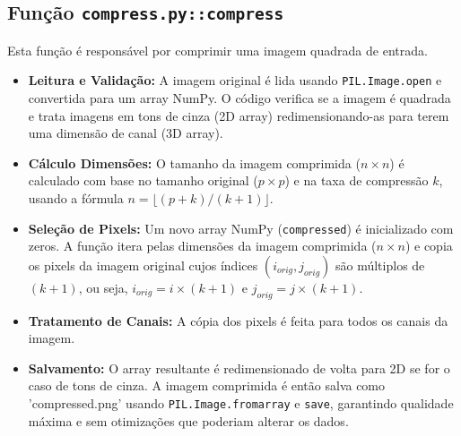 \documentclass[12pt, a4paper]{article}
\begin{document}
\subsection{Função \texttt{compress.py::compress}}
Esta função é responsável por comprimir uma imagem quadrada de entrada.
\begin{itemize}
    \item \textbf{Leitura e Validação:} A imagem original é lida usando \texttt{PIL.Image.open} e convertida para um array NumPy. O código verifica se a imagem é quadrada e trata imagens em tons de cinza (2D array) redimensionando-as para terem uma dimensão de canal (3D array).
    \item \textbf{Cálculo Dimensões:} O tamanho da imagem comprimida ($n \times n$) é calculado com base no tamanho original ($p \times p$) e na taxa de compressão $k$, usando a fórmula $n = \lfloor (p + k) / (k + 1) \rfloor$.
    \item \textbf{Seleção de Pixels:} Um novo array NumPy (\texttt{compressed}) é inicializado com zeros. A função itera pelas dimensões da imagem comprimida ($n \times n$) e copia os pixels da imagem original cujos índices $(i_{orig}, j_{orig})$ são múltiplos de $(k+1)$, ou seja, $i_{orig} = i \times (k+1)$ e $j_{orig} = j \times (k+1)$.
    \item \textbf{Tratamento de Canais:} A cópia dos pixels é feita para todos os canais da imagem.
    \item \textbf{Salvamento:} O array resultante é redimensionado de volta para 2D se for o caso de tons de cinza. A imagem comprimida é então salva como 'compressed.png' usando \texttt{PIL.Image.fromarray} e \texttt{save}, garantindo qualidade máxima e sem otimizações que poderiam alterar os dados.
\end{itemize}
\end{document}
